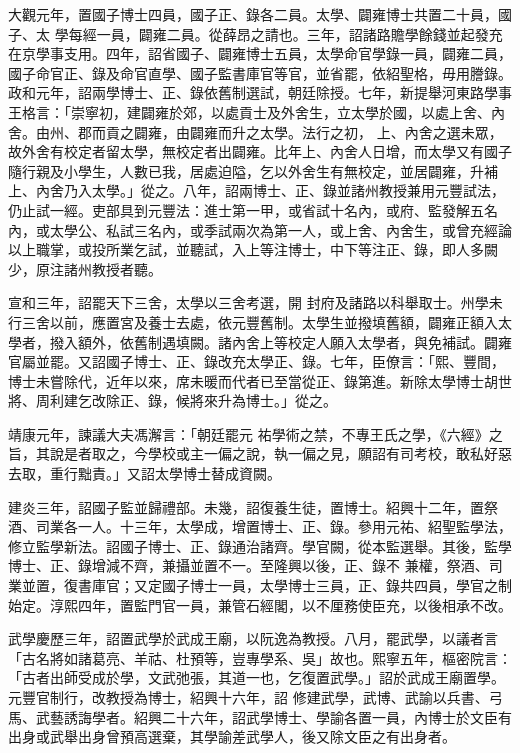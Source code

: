 \begin{pinyinscope}
 大觀元年，置國子博士四員，國子正、錄各二員。太學、闢雍博士共置二十員，國子、太
 學每經一員，闢雍二員。從薛昂之請也。三年，詔諸路贍學餘錢並起發充在京學事支用。四年，詔省國子、闢雍博士五員，太學命官學錄一員，闢雍二員，國子命官正、錄及命官直學、國子監書庫官等官，並省罷，依紹聖格，毋用謄錄。政和元年，詔兩學博士、正、錄依舊制選試，朝廷除授。七年，新提舉河東路學事王格言：「崇寧初，建闢雍於郊，以處貢士及外舍生，立太學於國，以處上舍、內舍。由州、郡而貢之闢雍，由闢雍而升之太學。法行之初，
 上、內舍之選未眾，故外舍有校定者留太學，無校定者出闢雍。比年上、內舍人日增，而太學又有國子隨行親及小學生，人數已我，居處迫隘，乞以外舍生有無校定，並居闢雍，升補上、內舍乃入太學。」從之。八年，詔兩博士、正、錄並諸州教授兼用元豐試法，仍止試一經。吏部具到元豐法：進士第一甲，或省試十名內，或府、監發解五名內，或太學公、私試三名內，或季試兩次為第一人，或上舍、內舍生，或曾充經論以上職掌，或投所業乞試，並聽試，入上等注博士，中下等注正、錄，即人多闕少，原注諸州教授者聽。



 宣和三年，詔罷天下三舍，太學以三舍考選，開
 封府及諸路以科舉取士。州學未行三舍以前，應置宮及養士去處，依元豐舊制。太學生並撥填舊額，闢雍正額入太學者，撥入額外，依舊制遇填闕。諸內舍上等校定人願入太學者，與免補試。闢雍官屬並罷。又詔國子博士、正、錄改充太學正、錄。七年，臣僚言：「熙、豐間，博士未嘗除代，近年以來，席未暖而代者已至當從正、錄第進。新除太學博士胡世將、周利建乞改除正、錄，候將來升為博士。」從之。



 靖康元年，諫議大夫馮澥言：「朝廷罷元
 祐學術之禁，不專王氏之學，《六經》之旨，其說是者取之，今學校或主一偏之說，執一偏之見，願詔有司考校，敢私好惡去取，重行黜責。」又詔太學博士替成資闕。



 建炎三年，詔國子監並歸禮部。未幾，詔復養生徒，置博士。紹興十二年，置祭酒、司業各一人。十三年，太學成，增置博士、正、錄。參用元祐、紹聖監學法，修立監學新法。詔國子博士、正、錄通治諸齊。學官闕，從本監選舉。其後，監學博士、正、錄增減不齊，兼攝並置不一。至隆興以後，正、錄不
 兼權，祭酒、司業並置，復書庫官；又定國子博士一員，太學博士三員，正、錄共四員，學官之制始定。淳熙四年，置監門官一員，兼管石經閣，以不厘務使臣充，以後相承不改。



 武學慶歷三年，詔置武學於武成王廟，以阮逸為教授。八月，罷武學，以議者言「古名將如諸葛亮、羊祜、杜預等，豈專學系、吳」故也。熙寧五年，樞密院言：「古者出師受成於學，文武弛張，其道一也，乞復置武學。」詔於武成王廟置學。元豐官制行，改教授為博士，紹興十六年，詔
 修建武學，武博、武諭以兵書、弓馬、武藝誘誨學者。紹興二十六年，詔武學博士、學諭各置一員，內博士於文臣有出身或武舉出身曾預高選棄，其學諭差武學人，後又除文臣之有出身者。




\end{pinyinscope}
